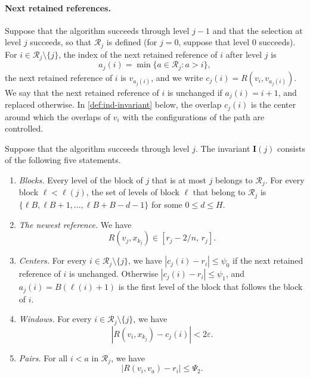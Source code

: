 \paragraph{Next retained references.} Suppose that the algorithm succeeds through level $j-1$ and that the selection at level $j$ succeeds, so that $\mathcal R_j$ is defined (for $j=0$, suppose that level $0$ succeeds). For $i\in\mathcal R_j\setminus\{j\}$, the index of the next retained reference of $i$ after level $j$ is
\[
 a_j(i)=\min\{a\in\mathcal R_j:a>i\},
\]
the next retained reference of $i$ is $v_{a_j(i)}$, and we write $c_j(i)=R(v_i,v_{a_j(i)})$. We say that the next retained reference of $i$ is unchanged if $a_j(i)=i+1$, and replaced otherwise. In \cref{def:ind-invariant} below, the overlap $c_j(i)$ is the center around which the overlaps of $v_i$ with the configurations of the path are controlled.

\begin{definition}\label{def:ind-invariant}
Suppose that the algorithm succeeds through level $j$. The invariant $\mathbf I(j)$ consists of the following five statements.
\begin{enumerate}[label=(\alph*)]
\item \emph{Blocks.} Every level of the block of $j$ that is at most $j$ belongs to $\mathcal R_j$. For every block ${\ell}<{\ell}(j)$, the set of levels of block ${\ell}$ that belong to $\mathcal R_j$ is $\{{\ell}B,{\ell}B+1,\dots,{\ell}B+B-d-1\}$ for some $0\le d\le H$.
\item \emph{The newest reference.} We have
\begin{equation}\label{b:dyn:newest-band}
 R(v_j,x_{k_j})\in[r_j-2/n,\,r_j].
\end{equation}
\item \emph{Centers.} For every $i\in\mathcal R_j\setminus\{j\}$, we have $|c_j(i)-r_i|\le\psi_0$ if the next retained reference of $i$ is unchanged. Otherwise $|c_j(i)-r_i|\le\psi_1$, and $a_j(i)=B({\ell}(i)+1)$ is the first level of the block that follows the block of $i$.
\item \emph{Windows.} For every $i\in\mathcal R_j\setminus\{j\}$, we have
\begin{equation}\label{b:dyn:anchor-invariant}
 |R(v_i,x_{k_j})-c_j(i)|<2\varepsilon.
\end{equation}
\item \emph{Pairs.} For all $i<a$ in $\mathcal R_j$, we have
\begin{equation}\label{b:dyn:pair-invariant}
 |R(v_i,v_a)-r_i|\le\Psi_2.
\end{equation}
\end{enumerate}
\end{definition}


